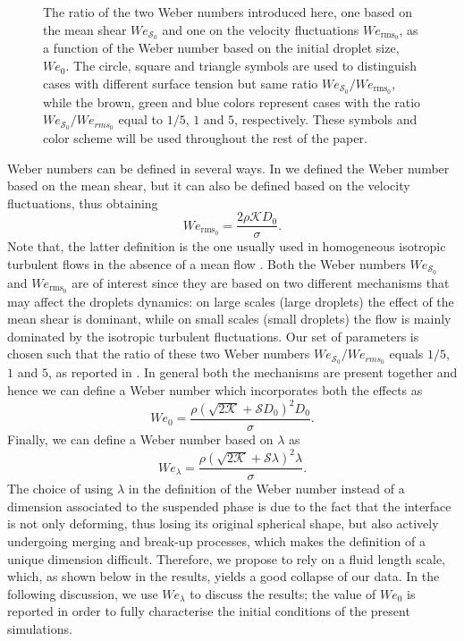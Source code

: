 \begin{figure}
	\centering
	 \vspace{0.5cm}
	\caption{The ratio of the two Weber numbers introduced here, one based on the mean shear $We_{\mathcal{S}_0}$ and one on the velocity fluctuations $We_{\textrm{rms}_0}$, as a function of the Weber number based on the initial droplet size, $We_0$. The circle, square and triangle symbols are used to distinguish cases with different surface tension but same ratio $We_{\mathcal{S}_0}/We_{\textrm{rms}_0}$, while the brown, green and blue colors represent cases with the ratio $We_{\mathcal{S}_0}/We_{{rms}_0}$ equal to $1/5$, $1$ and $5$, respectively. These symbols and color scheme will be used throughout the rest of the paper.}
	\label{fig:Web}
\end{figure}
Weber numbers can be defined in several ways. In  we defined the Weber number based on the mean shear, but it can also be defined based on the velocity fluctuations, thus obtaining
\begin{equation}
\label{eq:werms}
We_{\textrm{rms}_0} = \frac{2 \rho \mathcal{K} D_0}{\sigma}.
\end{equation}
Note that, the latter definition is the one usually used in homogeneous isotropic turbulent flows in the absence of a mean flow \citep{dodd_ferrante_2016a}. Both the Weber numbers $We_{\mathcal{S}_0}$ and $We_{\textrm{rms}_0}$ are of interest since they are based on two different mechanisms that may affect the droplets dynamics: on large scales (large droplets) the effect of the mean shear is dominant, while on small scales (small droplets) the flow is mainly dominated by the isotropic turbulent fluctuations. Our set of parameters is chosen such that the ratio of these two Weber numbers $We_{\mathcal{S}_0}/We_{{rms}_0}$ equals $1/5$, $1$ and $5$, as reported in . In general both the mechanisms are present together and hence we can define a Weber number which incorporates both the effects as
\begin{equation}
\label{eq:we0}
We_0 = \frac{\rho \left( \sqrt{2\mathcal{K}} + \mathcal{S} D_0 \right)^2 D_0}{\sigma}.
\end{equation}
Finally, we can define a Weber number based on $\lambda$ as
\begin{equation}
\label{eq:wel}
We_\lambda = \frac{\rho \left( \sqrt{2\mathcal{K}} + \mathcal{S} \lambda \right)^2 \lambda}{\sigma}.
\end{equation}
The choice of using $\lambda$ in the definition of the Weber number instead of a dimension associated to the suspended phase is due to the fact that the interface is not only deforming, thus losing its original spherical shape, but also actively undergoing merging and break-up processes, which makes the definition of a unique dimension difficult. Therefore, we propose to rely on a fluid length scale, which, as shown below in the results, yields a good collapse of our data. In the following discussion, we use $We_\lambda$ to discuss the results; the value of $We_0$ is reported in order to fully characterise the initial conditions of the present simulations.

